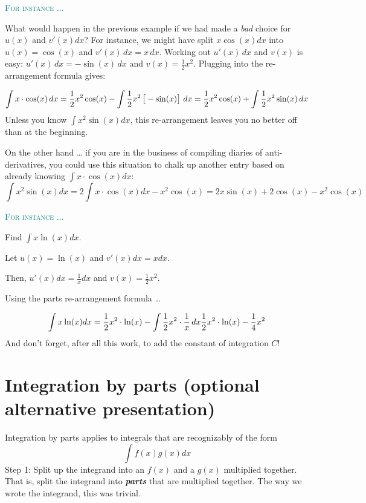 \documentclass[
  letterpaper,
  DIV=11,
  numbers=noendperiod,
  oneside]{scrreprt}
\newenvironment{example}%
{%
\textcolor{teal}{\hrulefill}%
  \par\vspace{.3\baselineskip}%
  \textcolor{teal}{\scshape For instance ...}%
  \par\vspace{\baselineskip}%
}%
{\textcolor{teal}{\hrulefill}}
\begin{document}
\begin{example}
What would happen in the previous example if we had made a \emph{bad}
choice for \(u(x)\) and \(v'(x) dx\)? For instance, we might have split
\(x \cos(x) dx\) into \(u(x) = \cos(x)\) and \(v'(x)\,dx = x\, dx\).
Working out \(u'(x)\,dx\) and \(v(x)\) is easy:
\(u'(x)\, dx = -\sin(x)\, dx\) and \(v(x) = \frac{1}{2} x^2\). Plugging
into the re-arrangement formula gives:

\[\int x \cdot \cos(x)\,dx = \frac{1}{2} x^2 \cos(x) - \int \frac{1}{2} x^2 \left[\strut - \sin(x)\right]\,dx = \frac{1}{2} x^2 \cos(x) + \int \frac{1}{2} x^2  \sin(x)\,dx\]
Unless you know \(\int x^2 \sin(x) dx\), this re-arrangement leaves you
no better off than at the beginning.

On the other hand \ldots{} if you are in the business of compiling
diaries of anti-derivatives, you could use this situation to chalk up
another entry based on already knowing \(\int x \cdot \cos(x) dx\):
\[\int x^2 \sin(x) dx = 2 \int x\cdot \cos(x)dx - x^2\cos(x) = 2x\sin(x) + 2\cos(x) - x^2 \cos(x)\]

\end{example}

\begin{example}
Find \(\int x \ln(x) dx\).

Let \(u(x) = \ln(x)\) and \(v'(x)dx = x dx\).

Then, \(u'(x)dx = \frac{1}{x} dx\) and \(v(x) = \frac{1}{2} x^2\).

Using the parts re-arrangement formula \ldots{}

\[\int x \ln(x) dx = \frac{1}{2} x^2 \cdot \ln(x) - \int \frac{1}{2} x^2\cdot \frac{1}{x}\, dx \\
\frac{1}{2} x^2 \cdot \ln(x) - \frac{1}{4} x^2\] And don't forget, after
all this work, to add the constant of integration \(C\)!

\end{example}

\hypertarget{integration-by-parts-optional-alternative-presentation}{%
\section{Integration by parts (optional alternative
presentation)}\label{integration-by-parts-optional-alternative-presentation}}

Integration by parts applies to integrals that are recognizably of the
form \[\int f(x) g(x) dx\] Step 1: Split up the integrand into an
\(f(x)\) and a \(g(x)\) multiplied together. That is, split the
integrand into \textbf{\emph{parts}} that are multiplied together. The
way we wrote the integrand, this was trivial.
\end{document}
